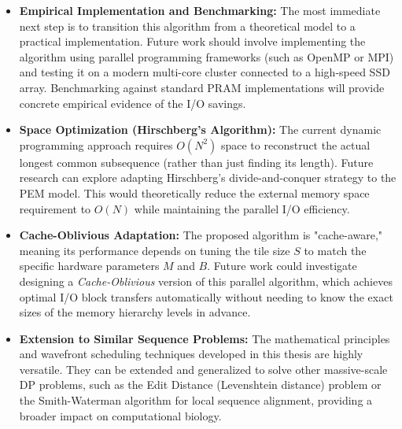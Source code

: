 \begin{itemize}
    \item \textbf{Empirical Implementation and Benchmarking:} The most immediate next step is to transition this algorithm from a theoretical model to a practical implementation. Future work should involve implementing the algorithm using parallel programming frameworks (such as OpenMP or MPI) and testing it on a modern multi-core cluster connected to a high-speed SSD array. Benchmarking against standard PRAM implementations will provide concrete empirical evidence of the I/O savings.
    
    \item \textbf{Space Optimization (Hirschberg's Algorithm):} The current dynamic programming approach requires $O(N^2)$ space to reconstruct the actual longest common subsequence (rather than just finding its length). Future research can explore adapting Hirschberg's divide-and-conquer strategy\cite{hirschberg-lsa-75} to the PEM model. This would theoretically reduce the external memory space requirement to $O(N)$ while maintaining the parallel I/O efficiency.
    
    \item \textbf{Cache-Oblivious Adaptation:} The proposed algorithm is "cache-aware," meaning its performance depends on tuning the tile size $S$ to match the specific hardware parameters $M$ and $B$. Future work could investigate designing a \textit{Cache-Oblivious} version\cite{chowdhury-codp-06} of this parallel algorithm, which achieves optimal I/O block transfers automatically without needing to know the exact sizes of the memory hierarchy levels in advance.
    
    \item \textbf{Extension to Similar Sequence Problems:} The mathematical principles and wavefront scheduling techniques developed in this thesis are highly versatile. They can be extended and generalized to solve other massive-scale DP problems, such as the Edit Distance (Levenshtein distance) problem or the Smith-Waterman algorithm for local sequence alignment, providing a broader impact on computational biology.
\end{itemize}
